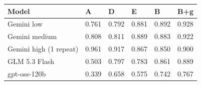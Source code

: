 \begin{tabularx}{\linewidth}{lYYYYY}
\toprule
Model & A & D & E & B & B+g \\
\midrule
Gemini low & 0.761 & 0.792 & 0.881 & 0.892 & 0.928 \\
Gemini medium & 0.808 & 0.811 & 0.889 & 0.883 & 0.922 \\
Gemini high (1 repeat) & 0.961 & 0.917 & 0.867 & 0.850 & 0.900 \\
GLM 5.3 Flash & 0.503 & 0.797 & 0.783 & 0.861 & 0.889 \\
gpt-oss-120b & 0.339 & 0.658 & 0.575 & 0.742 & 0.767 \\
\bottomrule
\end{tabularx}
